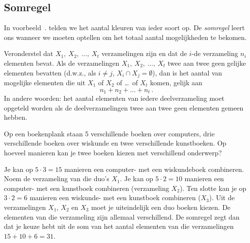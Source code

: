 \subsection{Somregel}
In voorbeeld~\thesection. telden we het aantal kleuren van ieder soort op. De \emph{somregel} leert ons wanneer we moeten optellen om het totaal aantal mogelijkheden te bekomen.

Veronderstel dat $X_1,~X_2,~\dots,~X_t$ verzamelingen zijn en dat de $i$-de verzameling $n_i$ elementen bevat. Als de verzamelingen $X_1,~X_2,~\dots,~X_t$  twee aan twee geen gelijke elementen bevatten (d.w.z., als $i\neq j$, $X_i\cap X_j=\emptyset$), dan is het aantal van mogelijke elementen die uit $X_1$ of $X_2$ of \dots\ of $X_t$ komen, gelijk aan \[n_1+n_2+\dots+n_t\,.\]
In andere woorden: het aantal elementen van iedere deelverzameling moet opgeteld worden als de deelverzamelingen twee aan twee geen elementen gemeen hebben.

\voorbeeld
Op een boekenplank staan 5 verschillende boeken over computers, drie verschillende boeken over wiskunde en twee verschillende kunstboeken. Op hoeveel manieren kan je twee boeken kiezen met verschillend onderwerp?

Je kan op $5\cdot 3=15$ manieren een computer- met een wiskundeboek combineren. Noem de verzameling van die duo's $X_1$. Je kan op $5\cdot2=10$ manieren een computer- met een kunstboek combineren (verzameling $X_2$). Ten slotte kan je op $3\cdot 2=6$ manieren een wiskunde- met een kunstboek combineren ($X_3$). Uit de verzamelingen $X_1$, $X_2$ en $X_3$ moet je uiteindelijk een duo boeken kiezen. De elementen van die verzameling zijn allemaal verschillend. De somregel zegt dan dat je keuze hebt uit de som van het aantal elementen van die verzamelingen $15+10+6=31$.

